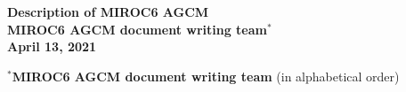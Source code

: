 \documentclass[11pt,a4paper,onecolumn]{article}
\begin{document}
  \begin{titlepage} %
    \vspace*{\fill}
      \begin{center}
        {\Huge \textbf{Description of MIROC6 AGCM}}\\
        \vspace{100mm}
        {\Large \textbf{MIROC6 AGCM document writing team$^*$}}\\
        \vspace{30mm}
        {\Large \textbf{April 13, 2021}}
      \end{center}
    \vspace*{\fill}
    $^*${\bf\textbf{MIROC6 AGCM document writing team}} (in alphabetical order)
    
  \end{titlepage}
%
  \clearpage
  
  \clearpage
  
  \clearpage
  
	\tableofcontents
	\clearpage
	\def\tightlist{\itemsep1pt\parskip0pt\parsep0pt}
  
  
	
	
	
	
	
	
	
	
	
	
	
	
	
	
	
	
	
	
	
	


%	
%	

\end{document}
